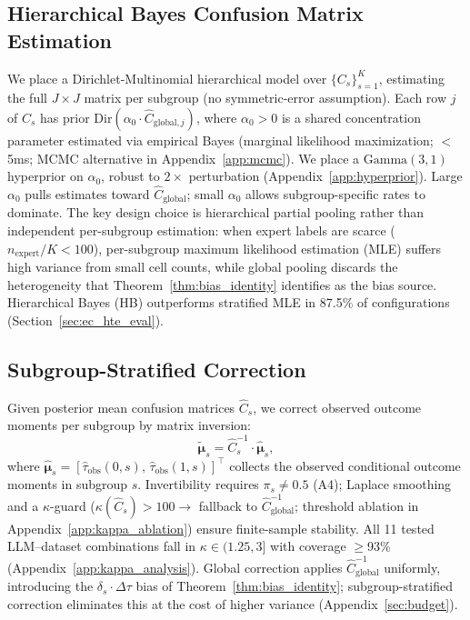 \subsection{Hierarchical Bayes Confusion Matrix Estimation}

We place a Dirichlet-Multinomial hierarchical model over $\{C_s\}_{s=1}^K$, estimating the full $J \times J$ matrix per subgroup (no symmetric-error assumption).
Each row $j$ of $C_s$ has prior $\text{Dir}(\alpha_0 \cdot \hat{C}_{\text{global},j})$, where $\alpha_0 > 0$ is a shared concentration parameter estimated via empirical Bayes (marginal likelihood maximization; $<$5ms; MCMC alternative in Appendix~\ref{app:mcmc}).
We place a $\mathrm{Gamma}(3, 1)$ hyperprior on $\alpha_0$, robust to $2\times$ perturbation (Appendix~\ref{app:hyperprior}).
Large $\alpha_0$ pulls estimates toward $\hat{C}_{\text{global}}$; small $\alpha_0$ allows subgroup-specific rates to dominate.
The key design choice is hierarchical partial pooling rather than independent per-subgroup estimation: when expert labels are scarce ($n_{\text{expert}} / K < 100$), per-subgroup maximum likelihood estimation (MLE) suffers high variance from small cell counts, while global pooling discards the heterogeneity that Theorem~\ref{thm:bias_identity} identifies as the bias source.
Hierarchical Bayes (HB) outperforms stratified MLE in 87.5\% of configurations (Section~\ref{sec:ec_hte_eval}).

\subsection{Subgroup-Stratified Correction}

Given posterior mean confusion matrices $\hat{C}_s$, we correct observed outcome moments per subgroup by matrix inversion:
\begin{equation}
\tilde{\boldsymbol{\mu}}_s = \hat{C}_s^{-1} \cdot \hat{\boldsymbol{\mu}}_s,
\end{equation}
where $\hat{\boldsymbol{\mu}}_s = [\hat{\tau}_{\text{obs}}(0, s),\, \hat{\tau}_{\text{obs}}(1, s)]^\top$ collects the observed conditional outcome moments in subgroup $s$.
Invertibility requires $\pi_s \neq 0.5$ (A4); Laplace smoothing and a $\kappa$-guard ($\kappa(\hat{C}_s) > 100 \to$ fallback to $\hat{C}_{\mathrm{global}}^{-1}$; threshold ablation in Appendix~\ref{app:kappa_ablation}) ensure finite-sample stability.
All 11 tested LLM--dataset combinations fall in $\kappa \in (1.25, 3]$ with coverage $\geq$93\% (Appendix~\ref{app:kappa_analysis}).
Global correction applies $\hat{C}_{\mathrm{global}}^{-1}$ uniformly, introducing the $\delta_s \cdot \Delta\tau$ bias of Theorem~\ref{thm:bias_identity}; subgroup-stratified correction eliminates this at the cost of higher variance (Appendix~\ref{sec:budget}).

